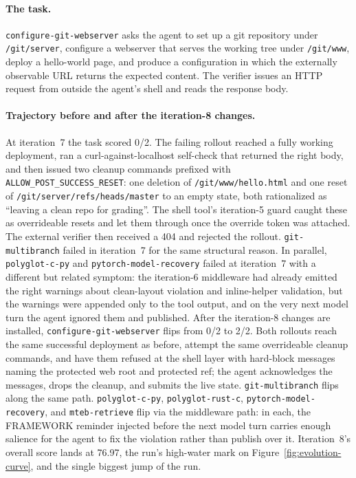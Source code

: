 \paragraph{The task.}
\texttt{configure-git-webserver} asks the agent to set up a git repository under \texttt{/git/server}, configure a webserver that serves the working tree under \texttt{/git/www}, deploy a hello-world page, and produce a configuration in which the externally observable URL returns the expected content. The verifier issues an HTTP request from outside the agent's shell and reads the response body.

\paragraph{Trajectory before and after the iteration-8 changes.}
At iteration~7 the task scored 0/2. The failing rollout reached a fully working deployment, ran a curl-against-localhost self-check that returned the right body, and then issued two cleanup commands prefixed with \texttt{ALLOW\_POST\_SUCCESS\_RESET}: one deletion of \texttt{/git/www/hello.html} and one reset of \texttt{/git/server/refs/heads/master} to an empty state, both rationalized as ``leaving a clean repo for grading''. The shell tool's iteration-5 guard caught these as overrideable resets and let them through once the override token was attached. The external verifier then received a 404 and rejected the rollout. \texttt{git-multibranch} failed in iteration~7 for the same structural reason. In parallel, \texttt{polyglot-c-py} and \texttt{pytorch-model-recovery} failed at iteration~7 with a different but related symptom: the iteration-6 middleware had already emitted the right warnings about clean-layout violation and inline-helper validation, but the warnings were appended only to the tool output, and on the very next model turn the agent ignored them and published. After the iteration-8 changes are installed, \texttt{configure-git-webserver} flips from 0/2 to 2/2. Both rollouts reach the same successful deployment as before, attempt the same overrideable cleanup commands, and have them refused at the shell layer with hard-block messages naming the protected web root and protected ref; the agent acknowledges the messages, drops the cleanup, and submits the live state. \texttt{git-multibranch} flips along the same path. \texttt{polyglot-c-py}, \texttt{polyglot-rust-c}, \texttt{pytorch-model-recovery}, and \texttt{mteb-retrieve} flip via the middleware path: in each, the FRAMEWORK reminder injected before the next model turn carries enough salience for the agent to fix the violation rather than publish over it. Iteration~8's overall score lands at 76.97, the run's high-water mark on Figure~\ref{fig:evolution-curve}, and the single biggest jump of the run.

